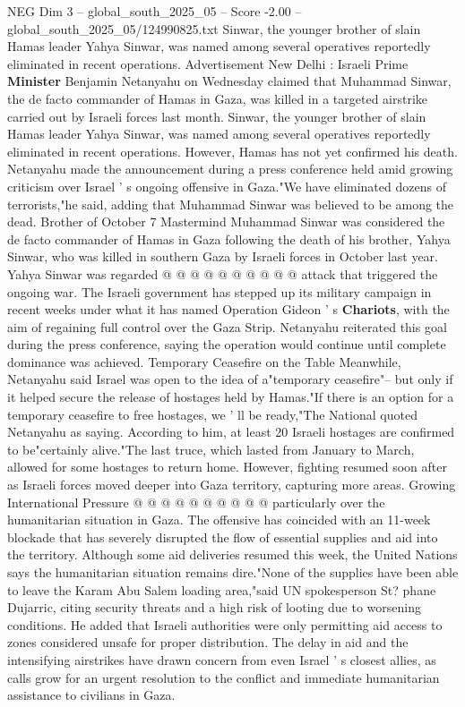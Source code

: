 \begin{textsample}{NEG Dim 3 – global\_south\_2025\_05 – Score -2.00 – global\_south\_2025\_05/124990825.txt}  \label{ex:f3_neg_180}
Sinwar, the younger brother of slain Hamas leader Yahya Sinwar, was named among several operatives reportedly eliminated in recent operations.
Advertisement New Delhi : Israeli Prime \textbf{Minister} Benjamin Netanyahu on Wednesday claimed that Muhammad Sinwar, the de facto commander of Hamas in Gaza, was killed in a targeted airstrike carried out by Israeli forces last month.
Sinwar, the younger brother of slain Hamas leader Yahya Sinwar, was named among several operatives reportedly eliminated in recent operations.
However, Hamas has not yet confirmed his death.
Netanyahu made the announcement during a press conference held amid growing criticism over Israel ' s ongoing offensive in Gaza."We have eliminated dozens of terrorists,"he said, adding that Muhammad Sinwar was believed to be among the dead.
Brother of October 7 Mastermind Muhammad Sinwar was considered the de facto commander of Hamas in Gaza following the death of his brother, Yahya Sinwar, who was killed in southern Gaza by Israeli forces in October last year.
Yahya Sinwar was regarded @ @ @ @ @ @ @ @ @ @ attack that triggered the ongoing war.
The Israeli government has stepped up its military campaign in recent weeks under what it has named Operation Gideon ' s \textbf{Chariots}, with the aim of regaining full control over the Gaza Strip.
Netanyahu reiterated this goal during the press conference, saying the operation would continue until complete dominance was achieved.
Temporary Ceasefire on the Table Meanwhile, Netanyahu said Israel was open to the idea of a"temporary ceasefire"-- but only if it helped secure the release of hostages held by Hamas."If there is an option for a temporary ceasefire to free hostages, we ' ll be ready,"The National quoted Netanyahu as saying.
According to him, at least 20 Israeli hostages are confirmed to be"certainly alive."The last truce, which lasted from January to March, allowed for some hostages to return home.
However, fighting resumed soon after as Israeli forces moved deeper into Gaza territory, capturing more areas.
Growing International Pressure @ @ @ @ @ @ @ @ @ @ particularly over the humanitarian situation in Gaza.
The offensive has coincided with an 11-week blockade that has severely disrupted the flow of essential supplies and aid into the territory.
Although some aid deliveries resumed this week, the United Nations says the humanitarian situation remains dire."None of the supplies have been able to leave the Karam Abu Salem loading area,"said UN spokesperson St? phane Dujarric, citing security threats and a high risk of looting due to worsening conditions.
He added that Israeli authorities were only permitting aid access to zones considered unsafe for proper distribution.
The delay in aid and the intensifying airstrikes have drawn concern from even Israel ' s closest allies, as calls grow for an urgent resolution to the conflict and immediate humanitarian assistance to civilians in Gaza.

\end{textsample}
